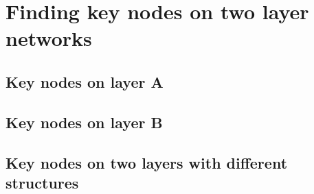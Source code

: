 
\chapter{Finding key nodes on two layer networks}
\label{chap:finding key nodes on two layer networks}
\section{Key nodes on layer A}
\section{Key nodes on layer B}
\section{Key nodes on two layers with different structures}
